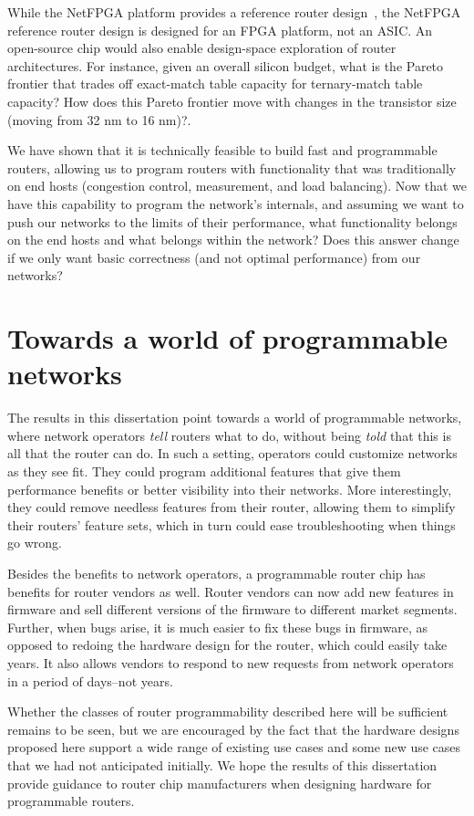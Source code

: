 While the NetFPGA platform provides a reference router design~\cite{netfpga},
the NetFPGA reference router design is designed for an FPGA platform, not an
ASIC. An open-source chip would also enable design-space exploration of router
architectures. For instance, given an overall silicon budget, what is the
Pareto frontier that trades off exact-match table capacity for ternary-match
table capacity? How does this Pareto frontier move with changes in the
transistor size (\eg moving from 32 nm to 16 nm)?.

 We have shown
that it is technically feasible to build fast and programmable routers,
allowing us to program routers with functionality that was traditionally on end
hosts (\eg congestion control, measurement, and load balancing). Now that we
have this capability to program the network's internals, and assuming we want
to push our networks to the limits of their performance, what functionality
belongs on the end hosts and what belongs within the network?  Does this answer
change if we only want basic correctness (and not optimal performance) from our
networks?

\section{Towards a world of programmable networks}

The results in this dissertation point towards a world of programmable
networks, where network operators \textit{tell} routers what to do, without
being \textit{told} that this is all that the router can do. In such a setting,
operators could customize networks as they see fit.  They could program
additional features that give them performance benefits or better visibility
into their networks.  More interestingly, they could remove needless features
from their router, allowing them to simplify their routers' feature sets, which
in turn could ease troubleshooting when things go wrong.

Besides the benefits to network operators, a programmable router chip has
benefits for router vendors as well. Router vendors can now add new features in
firmware and sell different versions of the firmware to different market
segments. Further, when bugs arise, it is much easier to fix these bugs in
firmware, as opposed to redoing the hardware design for the router, which could
easily take years. It also allows vendors to respond to new requests from
network operators in a period of days--not years.

Whether the classes of router programmability described here will be sufficient
remains to be seen, but we are encouraged by the fact that the hardware designs
proposed here support a wide range of existing use cases and some new use cases
that we had not anticipated initially. We hope the results of this dissertation
provide guidance to router chip manufacturers when designing hardware for
programmable routers.
